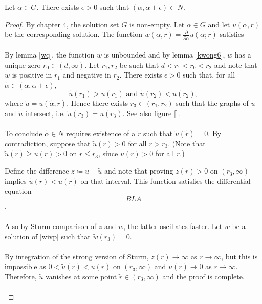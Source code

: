 \begin{lemma} Let $\alpha\in G$. There exists $\epsilon>0$ such that $(\alpha,\alpha+\epsilon)\subset N$.
\begin{proof} 
	
By chapter 4, the solution set $G$ is non-empty. Let $\alpha\in G$ and let $u(\alpha,r)$ be the corresponding solution.  The function $w(\alpha,r)=\frac{\partial}{\partial\alpha}u(\alpha;r)$ satisfies
\\ \\

By lemma \ref{wq}, the function $w$ is unbounded and by lemma \ref{kwong6}, $w$ has a unique zero $r_0\in(d,\infty)$. Let $r_1,r_2$ be such that $d<r_1<r_0<r_2$ and note that $w$ is positive in $r_1$ and negative in $r_2$. There exists $\epsilon>0$ such that, for all $\tilde\alpha\in(\alpha,\alpha+\epsilon)$,$$\tilde u(r_1)>u(r_1)\text{ and }\tilde u(r_2)<u(r_2),$$ where $\tilde u=u(\tilde\alpha,r)$. Hence there exists $r_3\in(r_1,r_2)$ such that the graphs of $u$ and $\tilde u$ intersect, i.e. $\tilde u(r_3)=u(r_3)$. See also figure \ref{}.
\\ \\

To conclude $\tilde\alpha\in N$ requires existence of a $\tilde r$ such that $\tilde u(\tilde r)=0$. By contradiction, suppose that $\tilde u(r)>0$ for all $r>r_3$. (Note that $\tilde u(r)\geq u(r)>0$ on $r\leq r_3$, since $u(r)>0$ for all $r$.)

Define the difference $z\coloneqq u-\tilde u$ and note that proving $z(r)>0$ on $(r_3,\infty)$ implies $\tilde u(r)<u(r)$ on that interval. This function satisfies the differential equation $$\label{zivp} BLA $$.
\\ \\

Also by Sturm comparison of $z$ and $w$, the latter oscillates faster. Let $\tilde w$ be a solution of \eqref{wivp} such that $\tilde w(r_3)=0$. 
\\ \\

By integration of the strong version of Sturm, $z(r)\to\infty$ as $r\to\infty$, but this is impossible as $0<\tilde u(r)<u(r)$ on $(r_3,\infty)$ and $u(r)\to0$ as $r\to\infty$. Therefore, $\tilde u$ vanishes at some point $\tilde r\in(r_3,\infty)$ and the proof is complete.
\\ \\ 


\end{proof}
\end{lemma}
